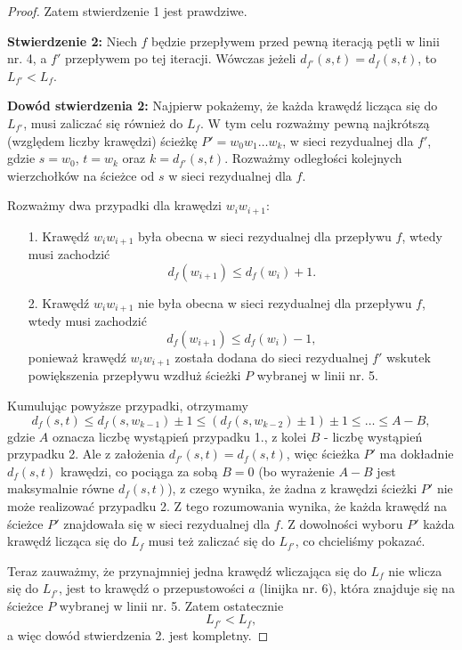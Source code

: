 \begin{theorem}
\begin{proof}
		Zatem stwierdzenie 1 jest prawdziwe.
		
		\textbf{Stwierdzenie 2:} Niech $f$ będzie przepływem przed
		pewną iteracją pętli w linii nr. 4, a $f'$ przepływem 
		po tej iteracji. Wówczas 
		jeżeli $d_{f'}(s, t) = d_f(s,t)$, to $L_{f'} < L_f$.
		
		\textbf{Dowód stwierdzenia 2:} Najpierw pokażemy, że
		każda krawędź licząca się do $L_{f'}$, musi zaliczać się
		również do $L_f$. W tym celu rozważmy pewną najkrótszą (względem
		liczby krawędzi) ścieżkę $P' = w_0 w_1 \dots w_k$,
		w sieci rezydualnej dla $f'$,
		gdzie $s = w_0$, $t = w_k$ oraz $k = d_{f'}(s, t)$.
		Rozważmy odległości kolejnych wierzchołków na ścieżce 
		od $s$ w sieci rezydualnej dla $f$. 
		
		Rozważmy dwa przypadki dla krawędzi $w_i w_{i+1}$:
		\begin{itemize}
			\item[1.] Krawędź $w_i w_{i+1}$ była obecna w sieci rezydualnej
			dla przepływu $f$, wtedy musi zachodzić 
			\[d_f(w_{i+1}) \leq d_f(w_{i}) + 1.\]
			\item[2.] Krawędź $w_i w_{i+1}$ nie była obecna w sieci rezydualnej
			dla przepływu $f$, wtedy musi zachodzić
			\[d_f(w_{i+1}) \leq d_f(w_{i}) - 1,\]
			ponieważ krawędź $w_i w_{i+1}$ została dodana
			do sieci rezydualnej $f'$ wskutek powiększenia przepływu
			wzdłuż ścieżki $P$ wybranej w linii nr. 5.
		\end{itemize}
		
		Kumulując powyższe przypadki, otrzymamy
		\[d_{f}(s, t) \leq d_{f}(s, w_{k-1}) \pm 1 \leq
		(d_{f}(s, w_{k-2}) \pm 1) \pm 1 \leq \ldots \leq A - B,\]
		gdzie $A$ oznacza liczbę wystąpień przypadku 1., z kolei
		$B$ - liczbę wystąpień przypadku 2. Ale z założenia 
		$d_{f'}(s,t)=d_f(s,t)$, więc ścieżka $P'$ ma dokładnie $d_f(s,t)$
		krawędzi, co pociąga za sobą $B = 0$ (bo wyrażenie
		$A-B$ jest maksymalnie równe $d_f(s,t)$), z czego wynika, 
		że żadna z krawędzi 
		ścieżki $P'$ nie może realizować przypadku 2. Z tego 
		rozumowania wynika, że każda krawędź na ścieżce $P'$
		znajdowała się w sieci rezydualnej dla $f$. Z dowolności wyboru
		$P'$ każda krawędź licząca się do $L_{f}$ musi też zaliczać się
		do $L_{f'}$, co chcieliśmy pokazać.
		
		Teraz zauważmy, że przynajmniej jedna krawędź wliczająca
		się do $L_f$ nie wlicza się do $L_{f'}$, jest to krawędź 
		o przepustowości $a$ (linijka nr. 6), która znajduje się
		na ścieżce $P$ wybranej w linii nr. 5. Zatem ostatecznie 
		\[L_{f'} < L_f,\]
		a więc dowód stwierdzenia 2. jest kompletny.
		

\end{proof}
\end{theorem}
